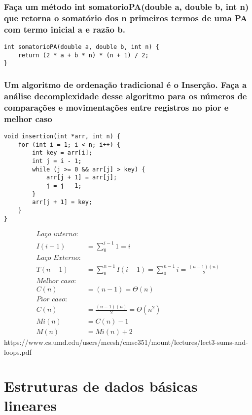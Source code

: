 \documentclass{article}
\begin{document}
\subsubsection{Faça um método int somatorioPA(double a, double b, int n) que retorna o somatório dos n primeiros termos de uma PA com termo inicial a e razão b.}
\begin{verbatim}
int somatorioPA(double a, double b, int n) {
    return (2 * a + b * n) * (n + 1) / 2;
}
\end{verbatim}

\subsubsection{Um algoritmo de ordenação tradicional é o Inserção. Faça a análise decomplexidade desse algoritmo para os números de comparações e
movimentações entre registros no pior e melhor caso}
\begin{verbatim}
void insertion(int *arr, int n) {
    for (int i = 1; i < n; i++) {
        int key = arr[i];
        int j = i - 1;
        while (j >= 0 && arr[j] > key) {
            arr[j + 1] = arr[j];
            j = j - 1;
        }
        arr[j + 1] = key;
    }
}
\end{verbatim}
\begin{equation}
    \begin{aligned}
    \textit{Laço interno:}\\
    I(i-1) &= \sum_0^{i-1}1 = i \\
    \textit{Laço Externo:} \\
    T(n-1) &= \sum_0^{n-1}I(i-1) = \sum_0^{n-1}i = \frac{(n-1)(n)}{2}\\
    \textit{Melhor caso:} \\
    C(n) &= (n - 1) = \Theta(n) \\
    \textit{Pior caso:} \\
    C(n) &= \frac{(n-1)(n)}{2} = \Theta(n^2) \\
    Mi(n) &= C(n) - 1 \\
    M(n) &= Mi(n) + 2
    \end{aligned}
\end{equation}
https://www.cs.umd.edu/users/meesh/cmsc351/mount/lectures/lect3-sums-and-loops.pdf

\section{Estruturas de dados básicas lineares}
\end{document}
